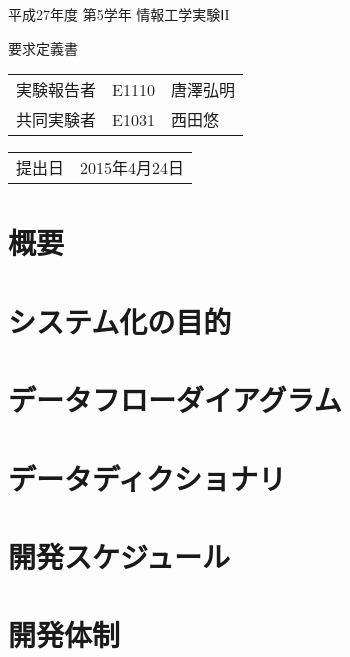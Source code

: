\documentclass[a4paper,11pt]{jsarticle}
\begin{document}
平成27年度 第5学年 情報工学実験ⅠI

\vspace{0.5in}

\begin{center}
\Huge
要求定義書

\vspace{2in}

\begin{table}[htbp]
\centering
\begin{tabular}{lll}
実験報告者 & E1110 & 唐澤弘明 \\
共同実験者 & E1031 & 西田悠 \\

\end{tabular}
\end{table}

\vspace{0.5in}

\begin{table}[htbp]
\centering
\begin{tabular}{ll}
提出日 & 2015年4月24日 \\
\end{tabular}
\end{table}
\end{center}


\setcounter{page}{0}
\thispagestyle{empty}
\newpage

\section{概要}


\section{システム化の目的}
\section{データフローダイアグラム}
\section{データディクショナリ}
\section{開発スケジュール}
\section{開発体制}
\end{document}
